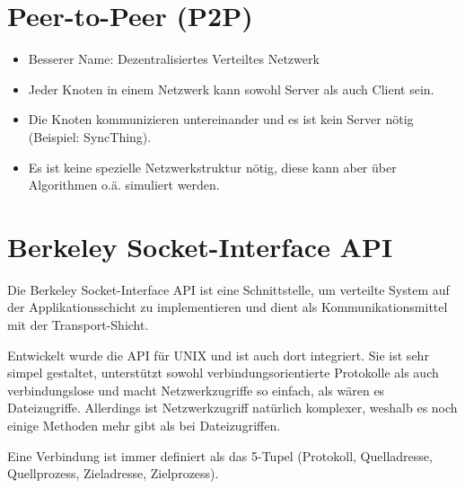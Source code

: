     \section{Peer-to-Peer (P2P)}
        \begin{itemize}
        	\item Besserer Name: Dezentralisiertes Verteiltes Netzwerk
        	\item Jeder Knoten in einem Netzwerk kann sowohl Server als auch Client sein.
        	\item Die Knoten kommunizieren untereinander und es ist kein Server nötig (Beispiel: SyncThing).
        	\item Es ist keine spezielle Netzwerkstruktur nötig, diese kann aber über Algorithmen o.ä. simuliert werden.
        \end{itemize}

    \section{Berkeley Socket-Interface API}
        Die Berkeley Socket-Interface API ist eine Schnittstelle, um verteilte System auf der Applikationsschicht zu implementieren und dient als Kommunikationsmittel mit der Transport-Shicht.
        
        Entwickelt wurde die API für UNIX und ist auch dort integriert. Sie ist sehr simpel gestaltet, unterstützt sowohl verbindungsorientierte Protokolle als auch verbindungslose und macht Netzwerkzugriffe so einfach, als wären es Dateizugriffe. Allerdings ist Netzwerkzugriff natürlich komplexer, weshalb es noch einige Methoden mehr gibt als bei Dateizugriffen.
        
        Eine Verbindung ist immer definiert als das 5-Tupel (Protokoll, Quelladresse, Quellprozess, Zieladresse, Zielprozess).


